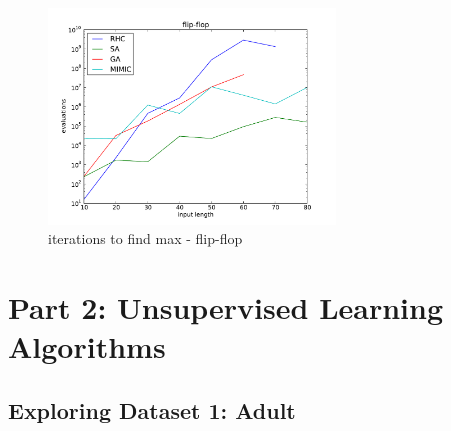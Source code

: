 \documentclass{sig-alternate}
\begin{document}
\begin{figure}[!htbp]
    \centering
    \includegraphics[width=3in]{part1.2/flip-flop-max.pdf}
    \caption{iterations to find max - flip-flop\label{max-flip-flop}}
\end{figure} 





\section{Part 2: Unsupervised Learning Algorithms}


\subsection{Exploring Dataset 1: Adult}
\end{document}
